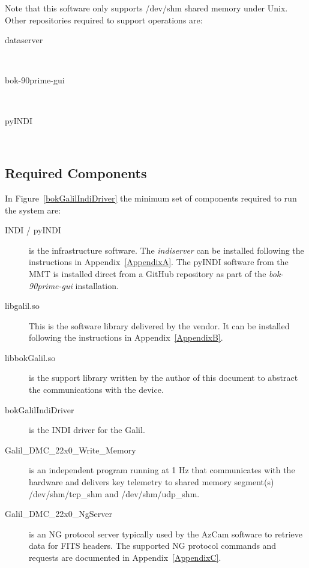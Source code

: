 \documentclass[12pt,twoside]{article}
\begin{document}
\noindent Note that this software only supports /dev/shm shared memory under Unix.
Other repositories required to support operations are:

\begin{description}
\item[dataserver]  \\
\item[bok-90prime-gui]  \\
\item[pyINDI]  \\
\end{description}

\subsection{Required Components}
\label{requiredcomponents}

In Figure~\ref{bokGalilIndiDriver} the minimum set of components required to run the system are:

\begin{description}
 \item[INDI / pyINDI] is the infrastructure software. The \emph{indiserver} can be installed following the instructions in
       Appendix~\ref{AppendixA}. The pyINDI software from the MMT is installed direct from a GitHub repository as part of
       the \emph{bok-90prime-gui} installation.
 \item[libgalil.so] This is the software library delivered by the vendor. It can be installed following the instructions in
       Appendix~\ref{AppendixB}.
 \item[libbokGalil.so] is the support library written by the author of this document to abstract the communications
      with the device.
 \item[bokGalilIndiDriver] is the INDI driver for the Galil.
 \item[Galil\_DMC\_22x0\_Write\_Memory] is an independent program running at 1 Hz that communicates with the 
       hardware and delivers key telemetry to shared memory segment(s) /dev/shm/tcp\_shm and /dev/shm/udp\_shm.
 \item[Galil\_DMC\_22x0\_NgServer] is an NG protocol server typically used by the AzCam software to retrieve data for FITS
      headers. The supported NG protocol commands and requests are documented in Appendix~\ref{AppendixC}.
\end{description}
\end{document}
